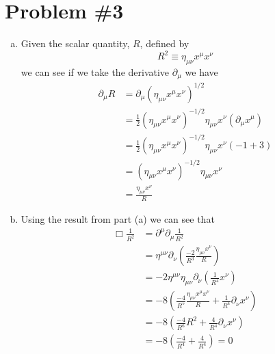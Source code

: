 \documentclass[11pt]{article}
\numberwithin{equation}{section}
\begin{document}
\section{Problem \#3}
\begin{enumerate}[(a)]
\item
    Given the scalar quantity, $R$, defined by
    $$R^2\equiv\eta_{\mu\nu}x^{\mu}x^{\nu}$$
    we can see if we take the derivative $\partial_{\mu}$ we have
    \begin{align*}
        \partial_{\mu}R &= \partial_{\mu}(\eta_{\mu\nu}x^{\mu}x^{\nu})^{1/2}\\
                        &= \frac{1}{2}(\eta_{\mu\nu}x^{\mu}x^{\nu})^{-1/2}\eta_{\mu\nu}x^{\nu}(\partial_{\mu}x^{\mu})\\
                        &= \frac{1}{2}(\eta_{\mu\nu}x^{\mu}x^{\nu})^{-1/2}\eta_{\mu\nu}x^{\nu}(-1+3)\\
                        &= (\eta_{\mu\nu}x^{\mu}x^{\nu})^{-1/2}\eta_{\mu\nu}x^{\nu}\\
                        &= \frac{\eta_{\mu\nu}x^{\nu}}{R}
    \end{align*}

\item
    Using the result from part (a) we can see that 
    \begin{align*}
        \Box\frac{1}{R^2} &=  \partial^{\mu}\partial_{\mu}\frac{1}{R^2}\\
                          &=  \eta^{\mu\nu}\partial_{\nu}\left(\frac{-2}{R^3}\frac{\eta_{\mu\nu}x^{\nu}}{R}\right)\\
                          &=  -2\eta^{\mu\nu}\eta_{\mu\nu}\partial_{\nu}\left(\frac{1}{R^4}x^{\nu}\right)\\
                          &=  -8\left(\frac{-4}{R^5}\frac{\eta_{\mu\nu}x^{\mu}x^{\nu}}{R} + \frac{1}{R^4}\partial_{\nu}x^{\nu}\right)\\
                          &=  -8\left(\frac{-4}{R^6}R^2 + \frac{4}{R^4}\partial_{\nu}x^{\nu}\right)\\
                          &=  -8\left(\frac{-4}{R^4} + \frac{4}{R^4}\right) = 0
    \end{align*}
\end{enumerate}

\pagebreak
\end{document}
